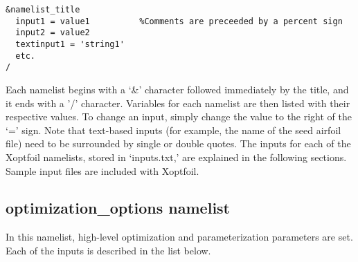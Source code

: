 \documentclass[11pt]{article}
\begin{document}
\begin{verbatim}
&namelist_title
  input1 = value1          %Comments are preceeded by a percent sign
  input2 = value2
  textinput1 = 'string1'
  etc.
/
\end{verbatim}

Each namelist begins with a `\&' character followed immediately by the title, and it ends with 
a '/' character.  Variables for each namelist are then listed with their respective
values.  To change an input, simply change the value to the right of the `=' sign.  Note
that text-based inputs (for example, the name of the seed airfoil file) need to be
surrounded by single or double quotes.  The inputs for each of the Xoptfoil namelists,
stored in `inputs.txt,' are explained in the following sections. Sample input files are
included with Xoptfoil.

\subsection{optimization\_options namelist}

In this namelist, high-level optimization and parameterization parameters are set.  Each
of the inputs is described in the list below.
\end{document}
